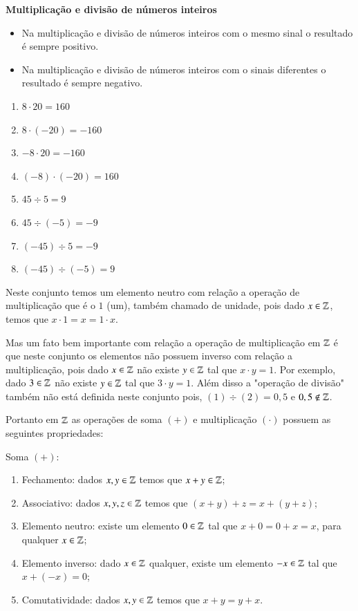  \textbf{Multiplicação e divisão de números inteiros}

  \begin{itemize}
   \item Na multiplicação e divisão de números inteiros com o mesmo sinal o resultado é sempre positivo.
   \item Na multiplicação e divisão de números inteiros com o sinais diferentes o resultado é sempre negativo.
  \end{itemize}

  \begin{multicols}{2}
  \begin{enumerate}[1)]
   \item $8 \cdot 20= 160$
   \item $8 \cdot (-20)= -160$
   \item $-8 \cdot 20= -160$
   \item $(-8) \cdot (-20)= 160$
   \item $45 \div 5= 9$
   \item $45 \div (-5)= -9$
   \item $(-45) \div 5= -9$
   \item $(-45) \div (-5)= 9$
  \end{enumerate}
  \end{multicols}

 Neste conjunto temos um elemento neutro com relação a operação de multiplicação que é o $1$ (um), também chamado de unidade, pois dado $x \in \mathbb{Z}$, temos que $x \cdot 1= x= 1 \cdot x$.

 Mas um fato bem importante com relação a operação de multiplicação em $\mathbb{Z}$ é que neste conjunto os elementos não possuem inverso com relação a multiplicação, pois dado $x \in \mathbb{Z}$ não existe $y \in \mathbb{Z}$ tal que $x \cdot y= 1$. Por exemplo, dado $3 \in \mathbb{Z}$ não existe $y \in \mathbb{Z}$ tal que $3 \cdot y= 1$. Além disso a "operação de divisão" também não está definida neste conjunto pois, $(1)\div (2)= 0,5$ e $0,5 \notin \mathbb{Z}$.
 
   \vskip0.3cm
 
 Portanto em $\mathbb{Z}$ as operações de soma $(+)$ e multiplicação $(\cdot)$ possuem as seguintes propriedades:
 
 Soma $(+)$:
 \begin{enumerate}[1)]
 \item Fechamento: dados $x, y \in \mathbb{Z}$ temos que $x+y \in \mathbb{Z}$;
 \item Associativo: dados $x, y, z \in \mathbb{Z}$ temos que $(x+y)+z= x+(y+z)$;
 \item Elemento neutro: existe um elemento $0 \in \mathbb{Z}$ tal que $x+0=0+x=x$, para qualquer $x \in \mathbb{Z}$;
 \item Elemento inverso: dado $x \in \mathbb{Z}$ qualquer, existe um elemento $-x \in \mathbb{Z}$ tal que $x+(-x)=0$;
 \item Comutatividade: dados $x, y \in \mathbb{Z}$ temos que $x+y= y+x$. 
 \end{enumerate}
 
